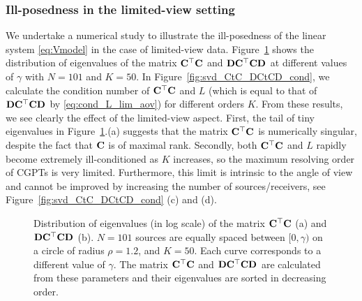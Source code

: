 \subsubsection{Ill-posedness in the limited-view setting}
\label{sec:recon_cgpt_num}
We undertake a numerical study to illustrate the ill-posedness of
the linear system \eqref{eq:Vmodel} in the case of
limited-view data. Figure~\ref{fig:svd_CtC_DCtCD_gamma} shows the
distribution of eigenvalues of the matrix $\mathbf{C}^\top\mathbf{C}$ and $\mathbf{D}\mathbf{C}^\top\mathbf{C}\mathbf{D}$ at
different values of $\gamma$ with $N=101$ and $K=50$. In
Figure~\ref{fig:svd_CtC_DCtCD_cond}, we calculate the condition
number of $\mathbf{C}^\top\mathbf{C}$ and $L$ (which is equal to that of $\mathbf{D}\mathbf{C}^\top\mathbf{C}\mathbf{D}$ by
\eqref{eq:cond_L_lim_aov}) for different orders $K$. From these
results, we see clearly the effect of the limited-view aspect.
First, the tail of tiny eigenvalues in
Figure~\ref{fig:svd_CtC_DCtCD_gamma}.(a) suggests that the matrix
$\mathbf{C}^\top\mathbf{C}$ is numerically singular, despite the fact that $\mathbf{C}$ is of
maximal rank. Secondly, both $\mathbf{C}^\top\mathbf{C}$ and $L$ rapidly become
extremely ill-conditioned as $K$ increases, so the maximum
resolving order of CGPTs is very limited. Furthermore, this limit
is intrinsic to the angle of view and cannot be improved by
increasing the number of sources/receivers, see
Figure~\ref{fig:svd_CtC_DCtCD_cond} (c) and (d).

\begin{figure}[htp]
  \centering
  \caption{Distribution of eigenvalues (in log scale) of the matrix $\mathbf{C}^\top\mathbf{C}$ (a) and $\mathbf{D}\mathbf{C}^\top\mathbf{C}\mathbf{D}$
    (b). $N=101$ sources are equally spaced between $[0,\gamma)$ on a circle of radius $\rho=1.2$,
    and $K=50$. Each curve corresponds to a different value of $\gamma$. The matrix $\mathbf{C}^\top\mathbf{C}$ and
    $\mathbf{D}\mathbf{C}^\top\mathbf{C}\mathbf{D}$ are calculated from these parameters and their eigenvalues are sorted in decreasing
    order.}
  \label{fig:svd_CtC_DCtCD_gamma}
\end{figure}

